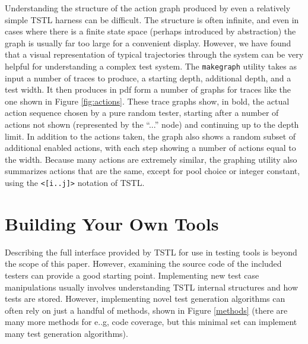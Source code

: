 Understanding the structure of the action graph produced by even a relatively simple TSTL harness can be difficult.  The structure is often infinite, and even in cases where there is a finite state space (perhaps introduced by abstraction) the graph is usually far too large for a convenient display.  However, we have found that a visual representation of typical trajectories through the system can be very helpful for understanding a complex test system.  The {\tt makegraph} utility takes as input a number of traces to produce, a starting depth, additional depth, and a test width.  It then produces in pdf form a number of graphs for traces like the one shown in Figure \ref{fig:actions}.  These trace graphs show, in bold, the actual action sequence chosen by a pure random tester, starting after a number of actions not shown (represented by the ``...'' node) and continuing up to the depth limit.  In addition to the actions taken, the graph also shows a random subset of additional enabled actions, with each step showing a number of actions equal to the width.  Because many actions are extremely similar, the graphing utility also summarizes actions that are the same, except for pool choice or integer constant, using the {\tt <[i..j]>} notation of TSTL.

\section{Building Your Own Tools}

Describing the full interface provided by TSTL for use in testing tools is beyond the scope of this paper.  However, examining the source code of the included testers can provide a good starting point.  Implementing new test case manipulations usually involves understanding TSTL internal structures and how tests are stored.  However, implementing novel test generation algorithms can often rely on just a handful of methods, shown in Figure \ref{methods} (there are many more methods for e..g, code coverage, but this minimal set can implement many test generation algorithms).

